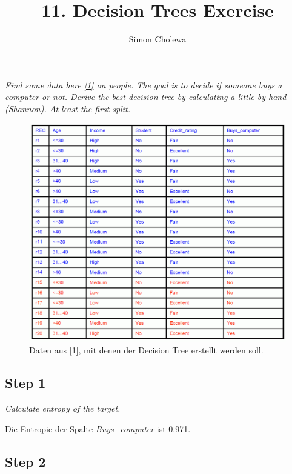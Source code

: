 \documentclass[11pt,a4paper]{article}
\author{Simon Cholewa}
\title{11. Decision Trees Exercise}
\begin{document}
\maketitle

\section{}

\textit{Find some data here \hyperref{https://drive.google.com/open?id=1E3bFrHnMGGmBgyAk9vAVnHGpQ8Z_asOP}{}{}{[1]} on people. The goal is to decide if someone buys a computer or not. Derive the best decision tree by calculating a little by hand (Shannon). At least the first split. }

\begin{figure}[h!]
	\centering
	\includegraphics[width=1\linewidth]{DATA}
	\caption{Daten aus [1], mit denen der Decision Tree erstellt werden soll.}
	\label{fig:data}
\end{figure}


\subsection*{Step 1}

\textit{Calculate entropy of the target.}

Die Entropie der Spalte \textit{Buys\_computer} ist 0.971.

\subsection*{Step 2}
\end{document}
